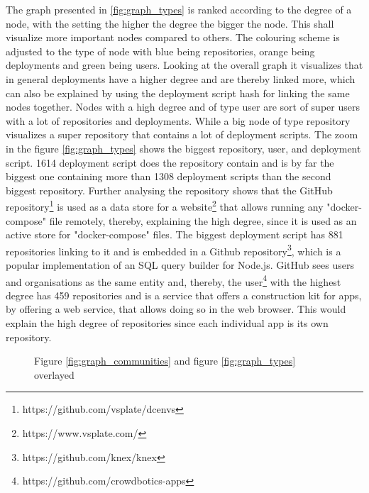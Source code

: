 The graph presented in \ref{fig:graph_types} is ranked according to the degree of a node, with the setting the higher the degree the bigger the node. This shall visualize more important nodes compared to others. The colouring scheme is adjusted to the type of node with blue being repositories, orange being deployments and green being users. Looking at the overall graph it visualizes that in general deployments have a higher degree and are thereby linked more, which can also be explained by using the deployment script hash for linking the same nodes together. Nodes with a high degree and of type user are sort of super users with a lot of repositories and deployments. While a big node of type repository visualizes a super repository that contains a lot of deployment scripts.
The zoom in the figure \ref{fig:graph_types} shows the biggest repository, user, and deployment script.
1614 deployment script does the repository contain and is by far the biggest one containing more than 1308 deployment scripts than the second biggest repository. Further analysing the repository shows that the GitHub repository\footnote{https://github.com/vsplate/dcenvs} is used as a data store for a website\footnote{https://www.vsplate.com/} that allows running any "docker-compose" file remotely, thereby, explaining the high degree, since it is used as an active store for "docker-compose" files.
The biggest deployment script has 881 repositories linking to it and is embedded in a Github repository\footnote{https://github.com/knex/knex}, which is a popular implementation of an SQL query builder for Node.js.
GitHub sees users and organisations as the same entity and, thereby, the user\footnote{https://github.com/crowdbotics-apps} with the highest degree has 459 repositories and is a service that offers a construction kit for apps, by offering a web service, that allows doing so in the web browser. This would explain the high degree of repositories since each individual app is its own repository.

\begin{figure}[H]\centering
{}
    \caption{Figure \ref{fig:graph_communities} and figure \ref{fig:graph_types} overlayed}
    \label{fig:graph_merged}
\end{figure}

